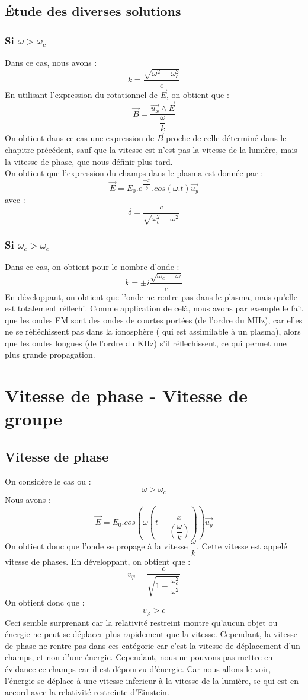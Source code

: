 \subsection{Étude des diverses solutions}
\subsubsection{Si $\omega > \omega_c$}
Dans ce cas, nous avons : 
$$k = \dfrac{\sqrt{\omega^2 - \omega_c^2}}{c}$$
En utilisant l'expression du rotationnel de $\overrightarrow{E}$, on obtient que : 
$$\overrightarrow{B} = \dfrac{\overrightarrow{u_x}\wedge\overrightarrow{E}}{\dfrac{\omega}{k}}$$
On obtient dans ce cas une expression de $\overrightarrow{B}$ proche de celle déterminé dans le chapitre précédent, sauf que la vitesse est n'est pas la vitesse de la lumière, mais la vitesse de phase, que nous définir plus tard.\\
On obtient que l'expression du champs dans le plasma est donnée par : 
$$\overrightarrow{E} = E_0.e^{\dfrac{-x}{\delta}}.cos(\omega.t)\overrightarrow{u_y}$$
avec : 
$$\delta = \dfrac{c}{\sqrt{\omega_c^2 - \omega^2}}$$
\subsubsection{Si $\omega_c > \omega_c$}
Dans ce cas, on obtient pour le nombre d'onde : 
$$k = \pm i \dfrac{\sqrt{\omega_c - \omega}}{c}$$
En développant, on obtient que l'onde ne rentre pas dans le plasma, mais qu'elle est totalement réflechi. Comme application de celà, nous avons par exemple le fait que les ondes FM sont des ondes de courtes portées (de l'ordre du MHz), car elles ne se réfléchissent pas dans la ionosphère ( qui est assimilable à un plasma), alors que les ondes longues (de l'ordre du KHz) s'il réflechissent, ce qui permet une plus grande propagation.
\section{Vitesse de phase - Vitesse de groupe}
\subsection{Vitesse de phase}
On considère le cas ou : 
$$\omega > \omega_c$$
Nous avons : 
$$\overrightarrow{E} = E_0.cos(\omega(t - \dfrac{x}{(\dfrac{\omega}{k})}))\overrightarrow{u_y}$$
On obtient donc que l'onde se propage à la vitesse $\dfrac{\omega}{k}$. Cette vitesse est appelé vitesse de phases. En développant, on obtient que : 
$$v_{\varphi} = \dfrac{c}{\sqrt{1 - \dfrac{\omega_c^2}{\omega^2}}}$$
On obtient donc que :
$$v_{\varphi} > c$$
Ceci semble surprenant car la relativité restreint montre qu'aucun objet ou énergie ne peut se déplacer plus rapidement que la vitesse. Cependant, la vitesse de phase ne rentre pas dans ces catégorie car c'est la vitesse de déplacement d'un champs, et non d'une énergie. Cependant, nous ne pouvons pas mettre en évidance ce champs car il est dépourvu d'énergie. Car nous allons le voir, l'énergie se déplace à une vitesse inferieur à la vitesse de la lumière, se qui est en accord avec la relativité restreinte d'Einstein.\\
